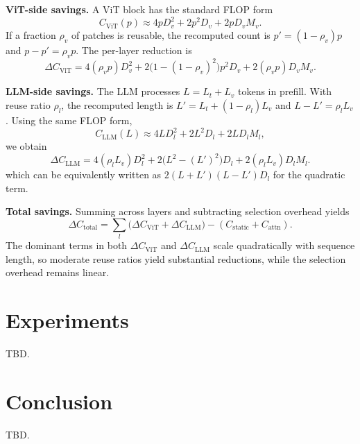 \documentclass[lettersize,journal]{IEEEtran}
\begin{document}
\textbf{ViT-side savings.} A ViT block has the standard FLOP form
\begin{equation}
    C_{\text{ViT}}(p) \approx 4 p D_v^2 + 2 p^2 D_v + 2 p D_v M_v.
    \label{eq:vit_flops}
\end{equation}
If a fraction $\rho_v$ of patches is reusable, the recomputed count is $p'=(1-\rho_v)p$ and $p-p'=\rho_v p$. The per-layer reduction is
\begin{equation}
    \Delta C_{\text{ViT}} = 4(\rho_v p)D_v^2 + 2\big(1-(1-\rho_v)^2\big)p^2 D_v + 2(\rho_v p)D_v M_v.
    \label{eq:vit_savings}
\end{equation}

\textbf{LLM-side savings.} The LLM processes $L=L_t+L_v$ tokens in prefill. With reuse ratio $\rho_l$, the recomputed length is $L'=L_t+(1-\rho_l)L_v$ and $L-L'=\rho_l L_v$. Using the same FLOP form,
\begin{equation}
    C_{\text{LLM}}(L) \approx 4 L D_l^2 + 2 L^2 D_l + 2 L D_l M_l,
    \label{eq:llm_flops}
\end{equation}
we obtain
\begin{equation}
    \Delta C_{\text{LLM}} = 4(\rho_l L_v)D_l^2 + 2\big(L^2-(L')^2\big)D_l + 2(\rho_l L_v)D_l M_l.
    \label{eq:llm_savings}
\end{equation}
which can be equivalently written as $2(L+L')(L-L')D_l$ for the quadratic term.

\textbf{Total savings.} Summing across layers and subtracting selection overhead yields
\begin{equation}
    \Delta C_{\text{total}} = \sum_l \big(\Delta C_{\text{ViT}} + \Delta C_{\text{LLM}}\big) - (C_{\text{static}} + C_{\text{attn}}).
    \label{eq:total_savings}
\end{equation}
The dominant terms in both $\Delta C_{\text{ViT}}$ and $\Delta C_{\text{LLM}}$ scale quadratically with sequence length, so moderate reuse ratios yield substantial reductions, while the selection overhead remains linear.

\section{Experiments}
TBD.

\section{Conclusion}
TBD.
\end{document}
